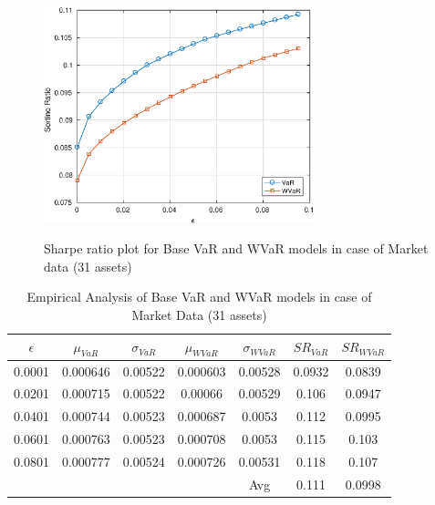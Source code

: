 \documentclass[12pt]{article}
\numberwithin{equation}{section}
\begin{document}






\newpage

\begin{figure}[!h]
\centering
\includegraphics[height=7.0cm,width=0.7\textwidth]{VaR/bse30_market/sr_cheb.eps}
\caption{Sharpe ratio plot for Base VaR and WVaR models in case of Market data (31 assets)}
\label{fig:5.1}
\end{figure}

\begin{table}[!h]
\centering
\captionsetup{justification=centering}
\begin{tabular}{||c|c|c|c|c|c|c||}
\hline
$\epsilon$ & $\mu_{VaR}$ & $\sigma_{VaR}$ & $\mu_{WVaR}$ & $\sigma_{WVaR}$ & $SR_{VaR}$ & $SR_{WVaR}$\\
\hline
0.0001 & 0.000646 & 0.00522 & 0.000603 & 0.00528 & 0.0932 & 0.0839 \\
0.0201 & 0.000715 & 0.00522 & 0.00066 & 0.00529 & 0.106 & 0.0947 \\
0.0401 & 0.000744 & 0.00523 & 0.000687 & 0.0053 & 0.112 & 0.0995 \\
0.0601 & 0.000763 & 0.00523 & 0.000708 & 0.0053 & 0.115 & 0.103 \\
0.0801 & 0.000777 &0.00524 & 0.000726 & 0.00531 & 0.118 & 0.107 \\
\hline
& & & & Avg & 0.111	& 0.0998 \\
\hline
\end{tabular}
\caption{Empirical Analysis of Base VaR and WVaR models in case of Market Data (31 assets)}
\label{tab:5.1}
\end{table}
\end{document}
